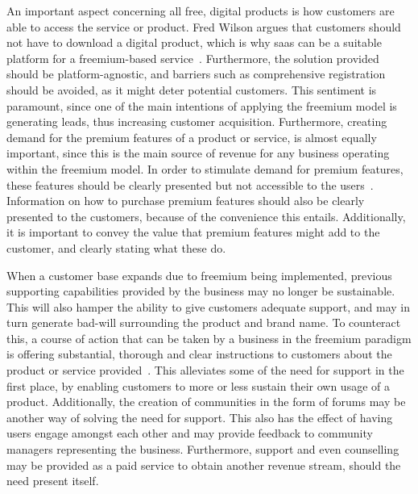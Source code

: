 \begin{itemize}
\end{itemize}


An important aspect concerning all free, digital products is how customers are able to access the service or product. Fred Wilson argues that customers should not have to download a digital product, which is why \gls{saas} can be a suitable platform for a freemium-based service~\cite{fredwilson20061}. Furthermore, the solution provided should be platform-agnostic, and barriers such as comprehensive registration should be avoided, as it might deter potential customers. This sentiment is paramount, since one of the main intentions of applying the freemium model is generating leads, thus increasing customer acquisition. Furthermore, creating demand for the premium features of a product or service, is almost equally important, since this is the main source of revenue for any business operating within the freemium model. In order to stimulate demand for premium features, these features should be clearly presented but not accessible to the users~\cite{bogdanpopescu2008}. Information on how to purchase premium features should also be clearly presented to the customers, because of the convenience this entails. Additionally, it is important to convey the value that premium features might add to the customer, and clearly stating what these do. 


When a customer base expands due to freemium being implemented, previous supporting capabilities provided by the business may no longer be sustainable. This will also hamper the ability to give customers adequate support, and may in turn generate bad-will surrounding the product and brand name. To counteract this, a course of action that can be taken by a business in the freemium paradigm is offering substantial, thorough and clear instructions to customers about the product or service provided~\cite{brucehadley2003}. This alleviates some of the need for support in the first place, by enabling customers to more or less sustain their own usage of a product. Additionally, the creation of communities in the form of forums may be another way of solving the need for support. This also has the effect of having users engage amongst each other and may provide feedback to community managers representing the business. Furthermore, support and even counselling may be provided as a paid service to obtain another revenue stream, should the need present itself. 

